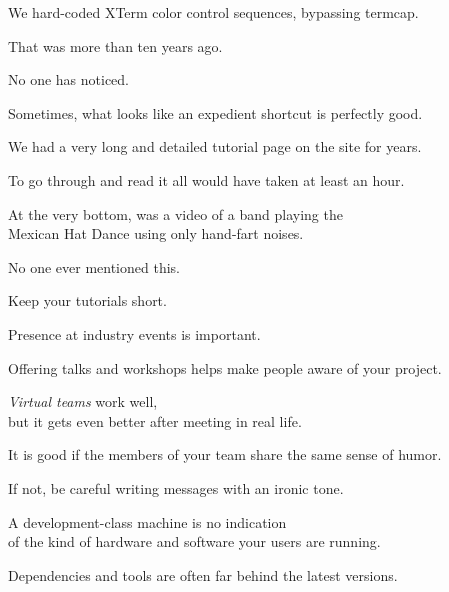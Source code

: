 \documentclass[t,handout,aspectratio=169]{beamer}
\begin{document}
\begin{frame}[fragile]%
    \vfill
    We hard-coded XTerm color control sequences, bypassing termcap.

    That was more than ten years ago.

    No one has noticed. \pause

    Sometimes, what looks like an expedient shortcut is perfectly good.
\end{frame}

\begin{frame}[fragile]%
    \vfill
    We had a very long and detailed tutorial page on the site for years.

    To go through and read it all would have taken at least an hour. \pause

    At the very bottom, was a video of a band playing the \\
    Mexican Hat Dance using only hand-fart noises. \pause

    No one ever mentioned this.

    Keep your tutorials short.
\end{frame}

\begin{frame}[fragile]%
    \vfill
    Presence at industry events is important. \pause

    Offering talks and workshops helps make people aware of your project.
\end{frame}

\begin{frame}[fragile]%
    \vfill
    \textit{Virtual teams} work well, \pause \\
    but it gets even better after meeting in real life.
\end{frame}

\begin{frame}[fragile]%
    \vfill
    It is good if the members of your team share the same sense of humor. \pause

    If not, be careful writing messages with an ironic tone.
\end{frame}

\begin{frame}[fragile]%
    \vfill
    A development-class machine is no indication \\
    of the kind of hardware and software your users are running. \pause

    Dependencies and tools are often far behind the latest versions.
\end{frame}
\end{document}
